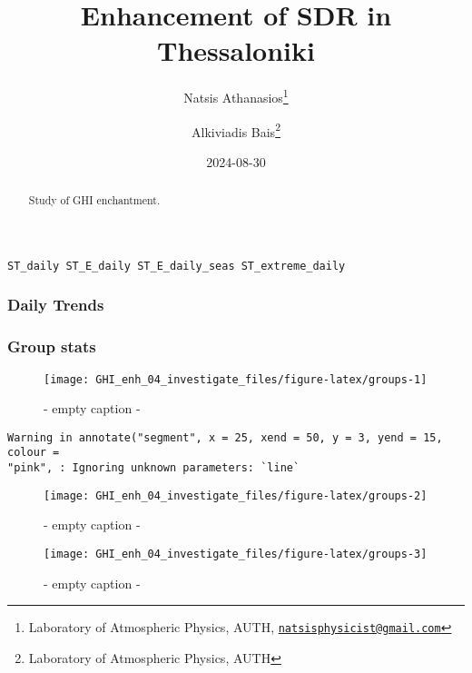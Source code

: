 \documentclass[
  10pt,
  a4paper,oneside]{article}
\title{Enhancement of SDR in Thessaloniki}
\author{Natsis Athanasios\footnote{Laboratory of Atmospheric Physics, AUTH, \href{mailto:natsisphysicist@gmail.com}{\nolinkurl{natsisphysicist@gmail.com}}} \and Alkiviadis Bais\footnote{Laboratory of Atmospheric Physics, AUTH}}
\date{2024-08-30}
\begin{document}
\maketitle
\begin{abstract}
Study of GHI enchantment.
\end{abstract}

{
\hypersetup{linkcolor=}
\setcounter{tocdepth}{4}
\tableofcontents
}
\begin{verbatim}
ST_daily ST_E_daily ST_E_daily_seas ST_extreme_daily
\end{verbatim}

\newpage
\FloatBarrier

\hypertarget{daily-trends}{%
\subsubsection{Daily Trends}\label{daily-trends}}

\newpage
\FloatBarrier

\hypertarget{group-stats}{%
\subsubsection{Group stats}\label{group-stats}}

\begin{figure}[H]

{\centering \texttt{[image: GHI\_enh\_04\_investigate\_files/figure-latex/groups-1]} 

}

\caption{ - empty caption - }\label{fig:groups-1}
\end{figure}

\begin{verbatim}
Warning in annotate("segment", x = 25, xend = 50, y = 3, yend = 15, colour =
"pink", : Ignoring unknown parameters: `line`
\end{verbatim}

\begin{figure}[H]

{\centering \texttt{[image: GHI\_enh\_04\_investigate\_files/figure-latex/groups-2]} 

}

\caption{ - empty caption - }\label{fig:groups-2}
\end{figure}
\begin{figure}[H]

{\centering \texttt{[image: GHI\_enh\_04\_investigate\_files/figure-latex/groups-3]} 

}

\caption{ - empty caption - }\label{fig:groups-3}
\end{figure}
\end{document}
